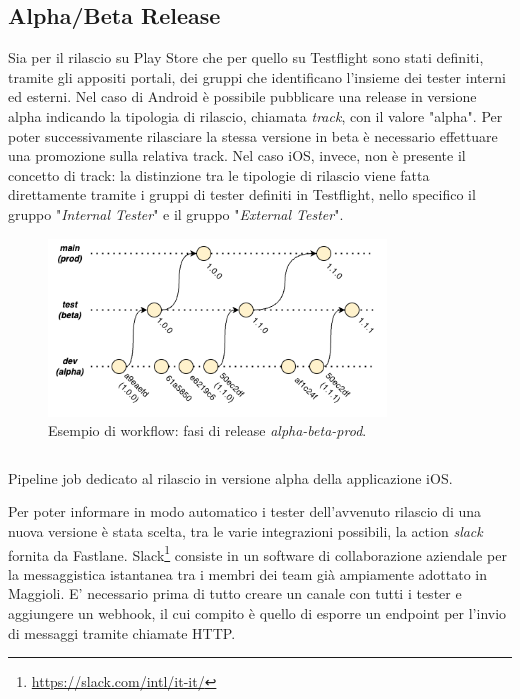 \subsection{Alpha/Beta Release}
Sia per il rilascio su Play Store che per quello su Testflight sono stati definiti, tramite gli appositi portali, dei gruppi che identificano l'insieme dei tester interni ed esterni. Nel caso di Android è possibile pubblicare una release in versione alpha indicando la tipologia di rilascio, chiamata \textit{track}, con il valore "alpha". Per poter successivamente rilasciare la stessa versione in beta è necessario effettuare una promozione sulla relativa track. Nel caso iOS, invece, non è presente il concetto di track: la distinzione tra le tipologie di rilascio viene fatta direttamente tramite i gruppi di tester definiti in Testflight, nello specifico il gruppo "\textit{Internal Tester}" e il gruppo "\textit{External Tester}".

\begin{figure}[H]
\centering
\includegraphics[width=0.8\textwidth]{img/tesi-18-release-flow.drawio.png}
\caption{Esempio di workflow: fasi di release \textit{alpha-beta-prod}.}
\end{figure}

\begin{listing}[H]
\inputminted{yaml}{code/4-ios-alpha}
\caption{Pipeline job dedicato al rilascio in versione alpha della applicazione iOS.}
\end{listing}

Per poter informare in modo automatico i tester dell'avvenuto rilascio di una nuova versione è stata scelta, tra le varie integrazioni possibili, la action \textit{slack} fornita da Fastlane. Slack\footnote{\url{https://slack.com/intl/it-it/}} consiste in un software di collaborazione aziendale per la messaggistica istantanea tra i membri dei team già ampiamente adottato in Maggioli. E' necessario prima di tutto creare un canale con tutti i tester e aggiungere un webhook, il cui compito è quello di esporre un endpoint per l'invio di messaggi tramite chiamate HTTP.

